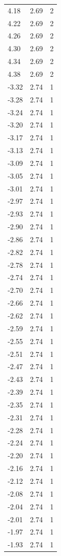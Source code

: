 \begin{longtable}{lrr}
  4.18 & 2.69 & 2 \\
  4.22 & 2.69 & 2 \\
  4.26 & 2.69 & 2 \\
  4.30 & 2.69 & 2 \\
  4.34 & 2.69 & 2 \\
  4.38 & 2.69 & 2 \\
  -3.32 & 2.74 & 1 \\
  -3.28 & 2.74 & 1 \\
  -3.24 & 2.74 & 1 \\
  -3.20 & 2.74 & 1 \\
  -3.17 & 2.74 & 1 \\
  -3.13 & 2.74 & 1 \\
  -3.09 & 2.74 & 1 \\
  -3.05 & 2.74 & 1 \\
  -3.01 & 2.74 & 1 \\
  -2.97 & 2.74 & 1 \\
  -2.93 & 2.74 & 1 \\
  -2.90 & 2.74 & 1 \\
  -2.86 & 2.74 & 1 \\
  -2.82 & 2.74 & 1 \\
  -2.78 & 2.74 & 1 \\
  -2.74 & 2.74 & 1 \\
  -2.70 & 2.74 & 1 \\
  -2.66 & 2.74 & 1 \\
  -2.62 & 2.74 & 1 \\
  -2.59 & 2.74 & 1 \\
  -2.55 & 2.74 & 1 \\
  -2.51 & 2.74 & 1 \\
  -2.47 & 2.74 & 1 \\
  -2.43 & 2.74 & 1 \\
  -2.39 & 2.74 & 1 \\
  -2.35 & 2.74 & 1 \\
  -2.31 & 2.74 & 1 \\
  -2.28 & 2.74 & 1 \\
  -2.24 & 2.74 & 1 \\
  -2.20 & 2.74 & 1 \\
  -2.16 & 2.74 & 1 \\
  -2.12 & 2.74 & 1 \\
  -2.08 & 2.74 & 1 \\
  -2.04 & 2.74 & 1 \\
  -2.01 & 2.74 & 1 \\
  -1.97 & 2.74 & 1 \\
  -1.93 & 2.74 & 1 \\

\end{longtable}
